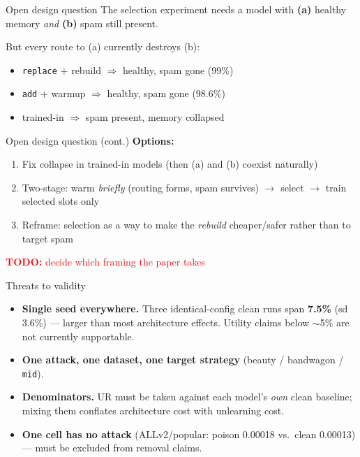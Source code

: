 \documentclass{beamer}
\newcommand{\todo}[1]{\textcolor{red}{\textbf{TODO:} #1}}
\begin{document}
\begin{frame}{Open design question}
The selection experiment needs a model with
\textbf{(a)} healthy memory \emph{and} \textbf{(b)} spam still present.

\medskip
But every route to (a) currently destroys (b):
\begin{itemize}
  \item \texttt{replace} + rebuild $\Rightarrow$ healthy, spam gone (99\%)
  \item \texttt{add} + warmup $\Rightarrow$ healthy, spam gone (98.6\%)
  \item trained-in $\Rightarrow$ spam present, memory collapsed
\end{itemize}

\end{frame}

\begin{frame}{Open design question (cont.)}
\textbf{Options:}
\begin{enumerate}
  \item Fix collapse in trained-in models (then (a) and (b) coexist naturally)
  \item Two-stage: warm \emph{briefly} (routing forms, spam survives)
        $\rightarrow$ select $\rightarrow$ train selected slots only
  \item Reframe: selection as a way to make the \emph{rebuild} cheaper/safer
        rather than to target spam
\end{enumerate}

\medskip
\todo{decide which framing the paper takes}
\end{frame}

\begin{frame}{Threats to validity}
\begin{itemize}
  \item \textbf{Single seed everywhere.} Three identical-config clean runs span
        \textbf{7.5\%} (sd 3.6\%) --- larger than most architecture effects.
        Utility claims below $\sim$5\% are not currently supportable.
  \item \textbf{One attack, one dataset, one target strategy}
        (beauty / bandwagon / \texttt{mid}).
  \item \textbf{Denominators.} UR must be taken against each model's \emph{own}
        clean baseline; mixing them conflates architecture cost with unlearning
        cost.
  \item \textbf{One cell has no attack} (ALLv2/popular: poison 0.00018 vs.\
        clean 0.00013) --- must be excluded from removal claims.
\end{itemize}
\end{frame}
\end{document}
